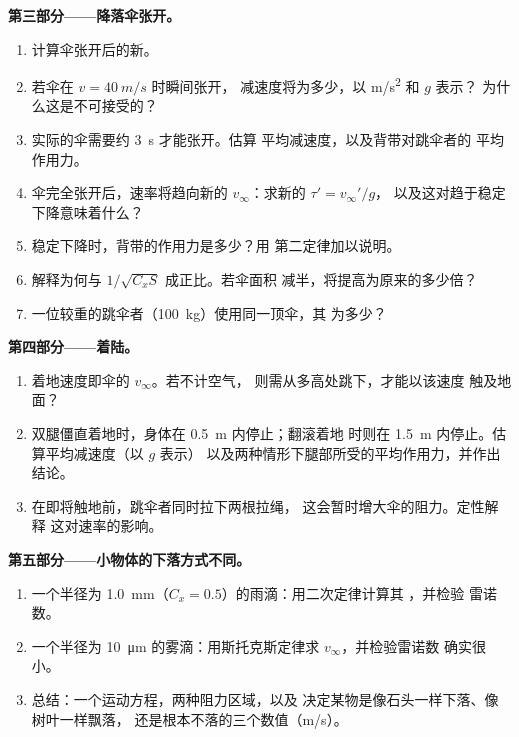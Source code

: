 \begin{problem}
\medskip
\noindent\textbf{第三部分——降落伞张开。}
\begin{enumerate}[resume]
  \item 计算伞张开后的新。
  \item 若伞在 $v = \qty{40}{m/s}$ 时瞬间张开，
        减速度将为多少，以 \unit{m/s^2} 和 $g$ 表示？
        为什么这是不可接受的？
  \item 实际的伞需要约 \qty{3}{s} 才能张开。估算
        平均减速度，以及背带对跳伞者的
        平均作用力。
  \item 伞完全张开后，速率将趋向新的
        $v_\infty$：求新的 $\tau' = v_\infty'/g$，
        以及这对趋于稳定下降意味着什么？
  \item 稳定下降时，背带的作用力是多少？用
        第二定律加以说明。
  \item 解释为何与 $1/\sqrt{C_xS}$ 成正比。若伞面积
        减半，将提高为原来的多少倍？
  \item 一位较重的跳伞者（\qty{100}{kg}）使用同一顶伞，其
        为多少？
\end{enumerate}

\medskip
\noindent\textbf{第四部分——着陆。}
\begin{enumerate}[resume]
  \item 着地速度即伞的 $v_\infty$。若不计空气，
        则需从多高处跳下，才能以该速度
        触及地面？
  \item 双腿僵直着地时，身体在 \qty{0.5}{m} 内停止；翻滚着地
        时则在 \qty{1.5}{m} 内停止。估算平均减速度（以 $g$ 表示）
        以及两种情形下腿部所受的平均作用力，并作出结论。
  \item 在即将触地前，跳伞者同时拉下两根拉绳，
        这会暂时增大伞的阻力。定性解释
        这对速率的影响。
\end{enumerate}

\medskip
\noindent\textbf{第五部分——小物体的下落方式不同。}
\begin{enumerate}[resume]
  \item 一个半径为 \qty{1.0}{mm}（$C_x = 0.5$）的雨滴：用二次定律计算其
        ，并检验
        雷诺数。
  \item 一个半径为 \qty{10}{\micro m} 的雾滴：用斯托克斯定律求
        $v_\infty$，并检验雷诺数
        确实很小。
  \item 总结：一个运动方程，两种阻力区域，以及
        决定某物是像石头一样下落、像树叶一样飘落，
        还是根本不落的三个数值（\unit{m/s}）。
\end{enumerate}
\end{problem}
